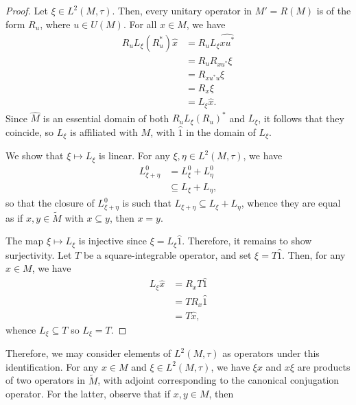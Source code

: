 \documentclass[10pt]{mypackage}
\begin{document}
\begin{proof}
  Let $\xi\in L^2\left( M,\tau \right)$. Then, every unitary operator in $M' = R\left( M \right)$ is of the form $R_u$, where $u\in U(M)$. For all $x\in M$, we have
  \begin{align*}
    R_uL_{\xi}\left( R_u^{\ast} \right)\hat{x} &= R_uL_{\xi} \widehat{xu^{\ast}}\\
                                               &= R_uR_{xu^{\ast}}\xi\\
                                               &= R_{xu^{\ast}u}\xi\\
                                               &= R_x\xi\\
                                               &= L_{\xi}\hat{x}.
  \end{align*}
  Since $\widehat{M}$ is an essential domain of both $R_uL_{\xi}\left( R_u \right)^{\ast}$ and $L_{\xi}$, it follows that they coincide, so $L_{\xi}$ is affiliated with $M$, with $\hat{1}$ in the domain of $L_{\xi}$.

  We show that $\xi\mapsto L_{\xi}$ is linear. For any $\xi,\eta\in L^2\left( M,\tau \right)$, we have
  \begin{align*}
    L_{\xi + \eta}^{0} &= L_{\xi}^{0} + L_{\eta}^{0}\\
                       &\subseteq L_{\xi} + L_{\eta},
  \end{align*}
  so that the closure of $L_{\xi + \eta}^{0}$ is such that $L_{\xi + \eta}\subseteq L_{\xi} + L_{\eta}$, whence they are equal as if $x,y\in \widetilde{M}$ with $x\subseteq y$, then $x = y$.

  The map $\xi\mapsto L_{\xi}$ is injective since $\xi = L_{\xi}\hat{1}$. Therefore, it remains to show surjectivity. Let $T$ be a square-integrable operator, and set $\xi = T\hat{1}$. Then, for any $x\in M$, we have
  \begin{align*}
    L_{\xi}\hat{x} &= R_xT\hat{1}\\
                   &= TR_x\hat{1}\\
                   &= T\hat{x},
  \end{align*}
  whence $L_{\xi}\subseteq T$ so $L_{\xi} = T$.
\end{proof}
Therefore, we may consider elements of $L^2\left( M,\tau \right)$ as operators under this identification. For any $x\in M$ and $\xi\in L^2\left( M,\tau \right)$, we have $\xi x$ and $x\xi$ are products of two operators in $ \widetilde{M} $, with adjoint corresponding to the canonical conjugation operator. For the latter, observe that if $x,y\in M$, then
\end{document}
